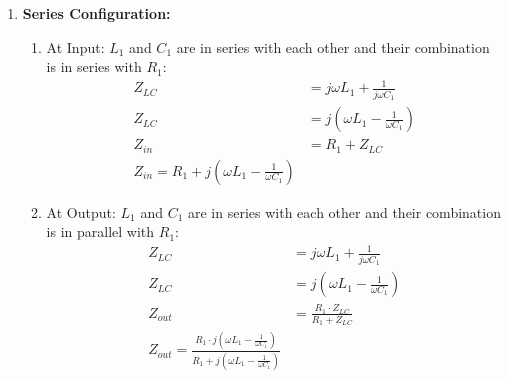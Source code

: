\begin{enumerate}
\begin{enumerate}
\begin{enumerate}
            \begin{align*}
              Z_{LC} &= \frac{j \omega L_1 \cdot \frac{1}{j \omega C_1}}{j \omega L_1 + \frac{1}{j \omega C_1}} \\
              Z_{LC} &= \frac{L_1}{C_1} \cdot \frac{j \omega C_1}{1 - \omega^2 L_1 C_1} \\
              Z_{LC} &= \frac{L_1 j \omega}{1 - \omega^2 L_1 C_1} \\
              Z_{out} &= \frac{R_1 \cdot Z_{LC}}{R_1 + Z_{LC}} \\
              Z_{out} &= \frac{R_1 \cdot \frac{L_1 j \omega}{1 - \omega^2 L_1 C_1}}{R_1 + \frac{L_1 j \omega}{1 - \omega^2 L_1 C_1}} \\
              Z_{out} &= \frac{\frac{R_1 L_1 j \omega}{1 - \omega^2 L_1 C_1}}{\frac{R_1(1 - \omega^2 L_1 C_1) + L_1 j \omega}{1 - \omega^2 L_1 C_1}} \\
              Z_{out} &= \frac{R_1 L_1 j \omega}{R_1(1 - \omega^2 L_1 C_1) + L_1 j \omega} \\
              \boxed{Z_{out} = \frac{R_1 L_1 j \omega}{R_1(1 - \omega^2 L_1 C_1) + L_1 j \omega}}
            \end{align*}
        \end{enumerate}
      \item \textbf{Series Configuration:}
        \begin{enumerate}
          \item At Input:
            \(L_1\) and \(C_1\) are in series with each other and
            their combination is in series with \(R_1\):
            \begin{align*}
              Z_{LC} &= j \omega L_1 + \frac{1}{j \omega C_1} \\
              Z_{LC} &= j \left(\omega L_1 - \frac{1}{\omega C_1}\right) \\
              Z_{in} &= R_1 + Z_{LC} \\
              \boxed{Z_{in} = R_1 + j \left(\omega L_1 - \frac{1}{\omega C_1}\right)}
            \end{align*}
          \item At Output:
            \(L_1\) and \(C_1\) are in series with each other and
            their combination is in parallel with \(R_1\):
            \begin{align*}
              Z_{LC} &= j \omega L_1 + \frac{1}{j \omega C_1} \\
              Z_{LC} &= j \left(\omega L_1 - \frac{1}{\omega C_1}\right) \\
              Z_{out} &= \frac{R_1 \cdot Z_{LC}}{R_1 + Z_{LC}} \\
              \boxed{Z_{out} = \frac{R_1 \cdot j \left(\omega L_1 - \frac{1}{\omega C_1}\right)}{R_1 + j \left(\omega L_1 - \frac{1}{\omega C_1}\right)}}
            \end{align*}
          \end{enumerate}
    \end{enumerate}
\end{enumerate}

